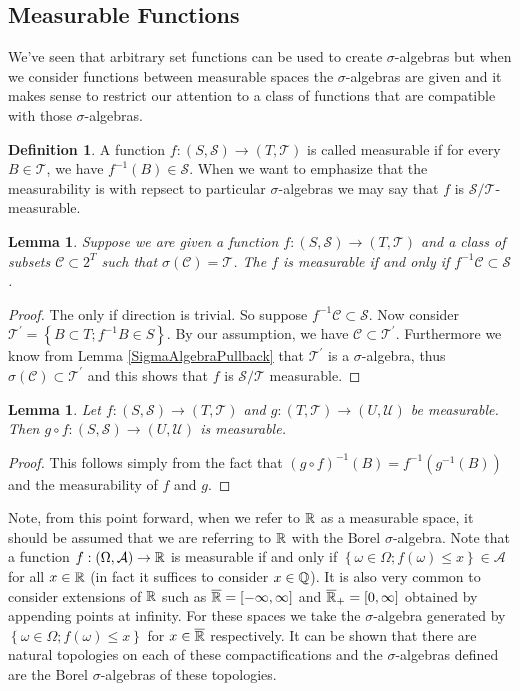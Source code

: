 \documentclass{amsart}
\newtheorem{lem}[thm]{Lemma}
\theoremstyle{remark}
\theoremstyle{definition}
\newtheorem{defn}[thm]{Definition}
\begin{document}
\subsection{Measurable Functions}
We've seen that arbitrary set functions can be used to create
$\sigma$-algebras but when we consider functions between
measurable spaces the $\sigma$-algebras are given and it makes sense
to restrict our attention to a class of functions that are compatible
with those $\sigma$-algebras.
\begin{defn}A function $f : (S,\mathcal{S}) \to (T,\mathcal{T})$ is
  called measurable if for every $B \in \mathcal{T}$, we have
  $f^{-1}(B) \in \mathcal{S}$.  When we want to emphasize that the
  measurability is with repsect to particular $\sigma$-algebras we may
  say that $f$ is $\mathcal{S}/\mathcal{T}$-measurable.
\end{defn}
\begin{lem}\label{MeasurableByGeneratingSet}Suppose we are given a function $f : (S,\mathcal{S}) \to
  (T,\mathcal{T})$ and a class of subsets $\mathcal{C} \subset 2^T$
  such that $\sigma(\mathcal{C}) = \mathcal{T}$.  The $f$ is
  measurable if and only if $f^{-1} \mathcal{C} \subset \mathcal{S}$.
\end{lem}
\begin{proof}The only if direction is trivial.  So suppose $f^{-1}  \mathcal{C} \subset \mathcal{S}$.
Now consider $\mathcal{T}^\prime = \left \{ B \subset T; f^{-1} B \in
  S \right \}$.  By our assumption, we have $\mathcal{C} \subset
\mathcal{T}^\prime$.  Furthermore we know from
Lemma \ref{SigmaAlgebraPullback} that $\mathcal{T}^\prime$ is
a $\sigma$-algebra, thus $\sigma(\mathcal{C}) \subset
\mathcal{T}^\prime$ and this shows that $f$ is
$\mathcal{S}/\mathcal{T}$ measurable.
\end{proof}
\begin{lem}\label{CompositionOfMeasurable}Let $f:(S,\mathcal{S}) \to (T,\mathcal{T})$
  and $g:(T,\mathcal{T}) \to (U,\mathcal{U})$ be measurable.  Then $g
  \circ f :(S,\mathcal{S}) \to (U,\mathcal{U})$ is measurable.
\end{lem}
\begin{proof}This follows simply from the fact that $(g \circ
  f)^{-1}(B) = f^{-1}(g^{-1}(B))$ and the measurability of $f$ and $g$.
\end{proof}
Note, from this point forward, when we refer to $\mathbb{R}$ as a
measurable space, it should be assumed that we are referring to
$\mathbb{R}$ with the Borel $\sigma$-algebra.  Note that a function
$f:(\Omega, \mathcal{A}) \to \mathbb{R}$ is measurable if and only if
$\left \{\omega \in \Omega ; f(\omega) \leq x \right \} \in \mathcal{A}$ for all $x \in \mathbb{R}$ (in fact
it suffices to consider $x \in \mathbb{Q}$).  It is also very common to consider
extensions of $\mathbb{R}$ such as $\overline{\mathbb{R}} = [-\infty,\infty]$
and $\overline{\mathbb{R}}_+ = [0,\infty]$
obtained by appending points at infinity.  For these spaces we take the $\sigma$-algebra
generated by $\left \{\omega \in \Omega ; f(\omega) \leq x \right \}$
for $x \in \overline{\mathbb{R}}$ respectively.  It can be shown that
there are natural topologies on each of these compactifications and
the $\sigma$-algebras defined are the Borel $\sigma$-algebras of these topologies.
\end{document}

